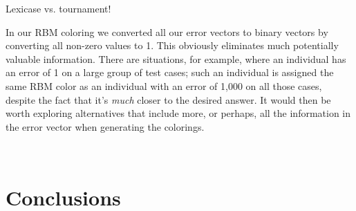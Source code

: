 \documentclass{sig-alternate}
\begin{document}
Lexicase vs. tournament!

In our RBM coloring we converted all our error vectors to binary vectors by
converting all non-zero values to 1. This obviously eliminates much potentially
valuable information. There are situations, for example, where an individual has
an error of 1 on a large group of test cases; such an individual is assigned
the same RBM color as an individual with an error of 1,000 on all those cases,
despite the fact that it's \emph{much} closer to the desired answer.
It would then be worth exploring alternatives that include
more, or perhaps, all the information in the error vector when generating the
colorings.

\

\section{Conclusions}
\label{sec:conclusions}




\end{document}
